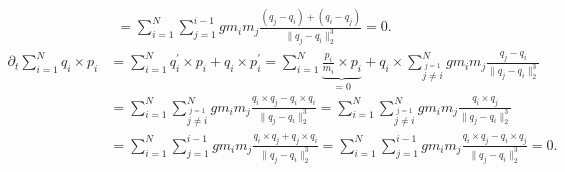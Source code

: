 \begin{solution}
\begin{align*}
    = \sum_{i=1}^N \sum_{j = 1}^{i-1} gm_im_j \frac{(q_j - q_i) + (q_i - q_j)}{\|q_j - q_i\|_2^3} = 0.
  \end{align*}
  \begin{align*}
    \partial_t \sum_{i=1}^N q_i \times p_i &= \sum_{i = 1}^Nq_i^{\prime} \times p_i + q_i \times p_i^{\prime}
    = \sum_{i = 1}^N\underbrace{\frac{p_i}{m_i} \times p_i}_{= 0} + q_i \times \sum_{\stackrel{j = 1}{j \neq i}}^N gm_im_j \frac{q_j - q_i}{\|q_j - q_i\|_2^3} \\
    &= \sum_{i = 1}^N \sum_{\stackrel{j = 1}{j \neq i}}^N gm_im_j \frac{q_i \times q_j - q_i \times q_i}{\|q_j - q_i\|_2^3}
    = \sum_{i = 1}^N \sum_{\stackrel{j = 1}{j \neq i}}^N gm_im_j \frac{q_i \times q_j}{\|q_j - q_i\|_2^3} \\
    &= \sum_{i = 1}^N \sum_{j = 1}^{i-1} gm_im_j \frac{q_i \times q_j + q_j \times q_i}{\|q_j - q_i\|_2^3}
    = \sum_{i = 1}^N \sum_{j = 1}^{i-1} gm_im_j \frac{q_i \times q_j - q_i \times q_j}{\|q_j - q_i\|_2^3} = 0.
  \end{align*}
\end{solution}
